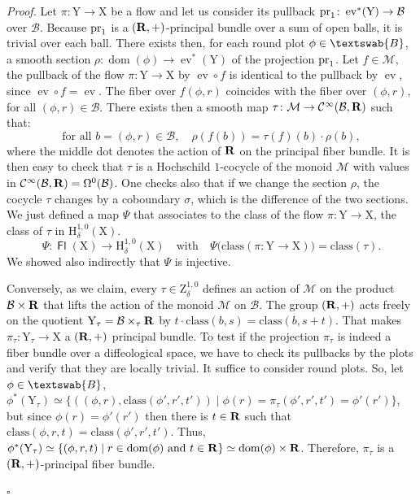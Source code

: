 \documentclass[12pt,reqno]{amsart}
\theoremstyle{article}
\renewenvironment{proof}{\noindent \textit{Proof.}} {\nolinebreak\hfill $\square$}
\def \H{\mathrm H}
\def \X{\mathrm X}
\def \Y{\mathrm Y}
\def \Z{\mathrm Z}
\newcommand{\RR}{{\bf R}}
\newcommand{\cB}{{\mathcal B}}
\newcommand{\cM}{\mathcal{M}}
\newcommand{\fB}{\textswab{B}}
\newcommand{\Cinfty}{{\mathcal C}^{\infty}}
\newcommand{\class}{\mathrm{class}}
\DeclareMathOperator{\dom}{dom}
\DeclareMathOperator{\ev}{ev}
\DeclareMathOperator{\Fl}{\mathsf{Fl}}
\newcommand{\pr}{{\rm pr}}
\def \H{\mathrm H}
\begin{document}
  \begin{proof}
    Let $\pi \colon \Y \to \X$ be a flow and let us consider its pullback $\pr_1 \colon \ev^*(\Y) \to \cB$ over $\cB$.
    Because $\pr_1$ is a $(\RR,+)$-principal bundle over a sum of open balls,
    it is trivial over each ball.
    There exists then,
    for each round plot $\phi \in \fB$,
    a smooth section $\rho \colon \dom(\phi) \to \ev^*(\Y)$ of the projection $\pr_1$.
    Let $f \in \cM$,
    the pullback of the flow $\pi \colon \Y \to \X$ by $\ev \circ f$ is identical to the pullback by $\ev$,
    since $\ev \circ f = \ev$.
    The fiber over $f(\phi,r)$ coincides with the fiber over $(\phi,r)$,
    for all $(\phi,r) \in \cB$.
    There exists then a smooth map $\tau \colon \cM \to \Cinfty(\cB, \RR)$ such that:
    $$
    \text{for all } b = (\phi,r) \in \cB, \quad \rho(f(b)) = \tau(f)(b) \cdot \rho(b),
    $$
    where the middle dot denotes the action of $\RR$ on the principal fiber bundle.
    It is then easy to check that $\tau$ is a Hochschild $1$-cocycle of the monoid $\cM$ with values in $\Cinfty(\cB,\RR) = \Omega^0(\cB)$.
    One checks also that if we change the section $\rho$,
    the cocycle $\tau$ changes by a coboundary $\sigma$,
    which is the difference of the two sections.
    We just defined a map $\Psi$ that associates to the class of the flow $\pi \colon \Y \to \X$,
    the class of $\tau$ in $\H_\delta^{1,0}(\X)$.
    $$
    \Psi \colon \Fl(\X) \to \H_\delta^{1,0}(\X)
    \quad\text{with}\quad
    \Psi\big(\class(\pi \colon \Y \to \X)\big) = \class(\tau).
    $$
    We showed also indirectly that $\Psi$ is injective.
    
    Conversely,
    as we claim,
    every $\tau \in \Z_\delta^{1,0}$ defines an action of $\cM$ on the product $\cB \times \RR$ that lifts the action of the monoid $\cM$ on $\cB$.
    The group $(\RR,+)$ acts freely on the quotient $\Y_\tau = \cB \times_\tau \RR$ by $t \cdot \class(b,s) = \class(b, s+t)$.
    That makes $\pi_\tau \colon \Y_\tau \to \X$ a $(\RR,+)$ principal bundle.
    To test if the projection $\pi_\tau$ is indeed a fiber bundle over a diffeological space,
    we have to check its pullbacks by the plots and verify that they are locally trivial.
    It suffice to consider round plots.
    So,
    let $\phi \in \fB$,
    $\phi^*(\Y_\tau) \simeq \{((\phi,r), \class(\phi',r',t')) \mid \phi(r) = \pi_\tau(\phi',r',t') = \phi'(r')\}$,
    but since $\phi(r) = \phi'(r')$ then there is $t \in \RR$ such that $\class(\phi,r,t) = \class(\phi',r',t')$.
    Thus,
    $\phi^*(\Y_\tau) \simeq \{(\phi,r,t) \mid r \in \dom(\phi) \text{ and } t \in \RR\} \simeq \dom(\phi) \times \RR$.
    Therefore,
    $\pi_\tau$ is a $(\RR,+)$-principal fiber bundle.
    

\end{proof}
\end{document}

